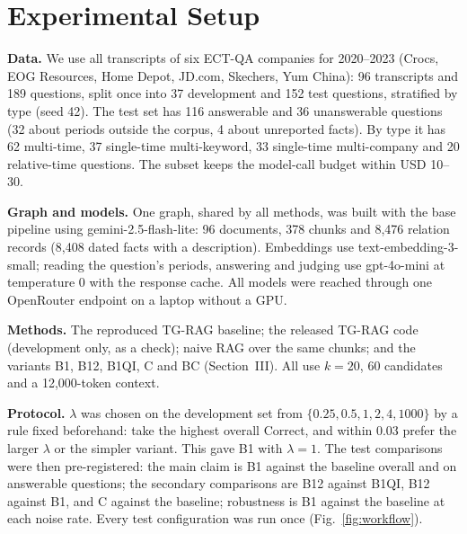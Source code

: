 \section{Experimental Setup}
\textbf{Data.} We use all transcripts of six ECT-QA companies for 2020--2023 (Crocs, EOG Resources, Home Depot, JD.com, Skechers, Yum China): 96 transcripts and 189 questions, split once into 37 development and 152 test questions, stratified by type (seed 42). The test set has 116 answerable and 36 unanswerable questions (32 about periods outside the corpus, 4 about unreported facts). By type it has 62 multi-time, 37 single-time multi-keyword, 33 single-time multi-company and 20 relative-time questions. The subset keeps the model-call budget within USD 10--30.

\textbf{Graph and models.} One graph, shared by all methods, was built with the base pipeline using gemini-2.5-flash-lite: 96 documents, 378 chunks and 8,476 relation records (8,408 dated facts with a description). Embeddings use text-embedding-3-small; reading the question's periods, answering and judging use gpt-4o-mini at temperature 0 with the response cache. All models were reached through one OpenRouter endpoint on a laptop without a GPU.

\textbf{Methods.} The reproduced TG-RAG baseline; the released TG-RAG code (development only, as a check); naive RAG over the same chunks; and the variants B1, B12, B1QI, C and BC (Section~III). All use $k = 20$, 60 candidates and a 12,000-token context.

\textbf{Protocol.} $\lambda$ was chosen on the development set from $\{0.25, 0.5, 1, 2, 4, 1000\}$ by a rule fixed beforehand: take the highest overall Correct, and within 0.03 prefer the larger $\lambda$ or the simpler variant. This gave B1 with $\lambda = 1$. The test comparisons were then pre-registered: the main claim is B1 against the baseline overall and on answerable questions; the secondary comparisons are B12 against B1QI, B12 against B1, and C against the baseline; robustness is B1 against the baseline at each noise rate. Every test configuration was run once (Fig.~\ref{fig:workflow}).

